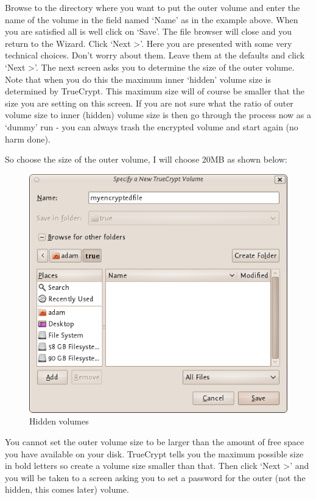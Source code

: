 Browse to the directory where you want to put the outer volume and enter
the name of the volume in the field named `Name' as in the example
above. When you are satisfied all is well click on `Save'. The file
browser will close and you return to the Wizard. Click `Next
\textgreater{}'. Here you are presented with some very technical
choices. Don't worry about them. Leave them at the defaults and click
`Next \textgreater{}'. The next screen asks you to determine the size of
the outer volume. Note that when you do this the maximum inner `hidden'
volume size is determined by TrueCrypt. This maximum size will of course
be smaller that the size you are setting on this screen. If you are not
sure what the ratio of outer volume size to inner (hidden) volume size
is then go through the process now as a `dummy' run - you can always
trash the encrypted volume and start again (no harm done).

So choose the size of the outer volume, I will choose 20MB as shown
below:

\begin{figure}[htbp]
\centering
\includegraphics{hidden_vol_005.png}
\caption{Hidden volumes}
\end{figure}

You cannot set the outer volume size to be larger than the amount of
free space you have available on your disk. TrueCrypt tells you the
maximum possible size in bold letters so create a volume size smaller
than that. Then click `Next \textgreater{}' and you will be taken to a
screen asking you to set a password for the outer (not the hidden, this
comes later) volume.

